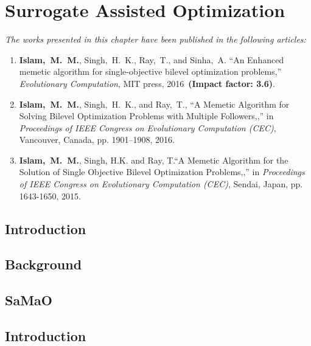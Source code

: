\chapter{Surrogate Assisted Optimization}
\label{chapter:3}

\begin{tcolorbox}
\textit{The works presented in this chapter have been published in the following articles:}
\begin{enumerate}
\small
\item \textbf{Islam,~M.~M.}, {Singh,~H.~K.},  {Ray,~T.}, and {Sinha,~A.} ``An Enhanced memetic algorithm for single-objective bilevel optimization problems,'' {\em Evolutionary Computation}, MIT press, 2016~\textbf{(Impact factor: 3.6)}.
\item \textbf{Islam,~M.~M.}, {Singh,~H.~K.}, and {Ray,~T.}, ``A Memetic Algorithm for Solving Bilevel Optimization Problems with Multiple Followers,,'' in {\em Proceedings of IEEE Congress on Evolutionary Computation (CEC)}, Vancouver, Canada, pp. 1901--1908, 2016.
\item  \textbf{Islam,~M.~M.}, {Singh, H.K.} and {Ray, T.}``A Memetic Algorithm for the Solution of Single Objective Bilevel Optimization Problems,,'' in {\em Proceedings of IEEE Congress on Evolutionary Computation (CEC)}, Sendai, Japan, pp. 1643-1650, 2015.

\end{enumerate}

\end{tcolorbox}


\section{Introduction}
\label{sec:intro}






\section{Background}
\label{sec:back}

\section{SaMaO}

\section{Introduction}
\label{sec:KHTsec:1}


